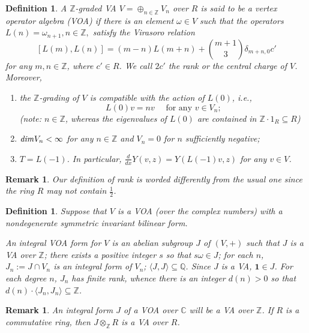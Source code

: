 \documentclass[12pt]{article}
\def\labtt#1{\label {#1} }
\def\CC{{\mathbb C}}
\def\ZZ{{\mathbb Z}}
\def\bs{\it}            %
\def\dim{{\bs dim}}
\newtheorem{rem}[thm]{Remark}
\newtheorem{de}[thm]{Definition}
\begin{document}
\begin{de}\labtt{defvoa}
A $\ZZ$-graded VA  $V=\oplus _{n\in \ZZ}  V_{n}$ over $R$ is said to be a  \emph{vertex operator algebra (VOA)}  if there is an element $\omega \in V$ such that the operators $L(n)=\omega_{n+1}, n\in \ZZ,$ satisfy the Virasoro relation
\[
[L(m) , L (n)] = (m - n) L (m + n) + \binom{m+1}3 \delta_{m+n,0} c'
\]
for  any $m, n\in \ZZ$, where $c' \in R$.   We call  $2c'$ the rank or the central charge of $V$.   Moreover,
\begin{enumerate}
\item  the $\ZZ$-grading of $V$ is compatible with the action of $L(0)$, i.e.,
\[
L (0) v = nv \quad \text{ for any }v \in V_n;
\]
(note:  $n\in \ZZ$, whereas the eigenvalues of $L(0)$ are contained in $\ZZ\cdot 1_R \subseteq   R$)


\item $\dim V_n< \infty $ for any $n\in \ZZ$ and $V_n=0$ for $n$ sufficiently negative;

\item $T=L(-1)$. In particular,  $\frac{d} {dx} Y (v, z) = Y (L ( -1) v, z)$ for any $v\in V$.
\end{enumerate}
\end{de}


\begin{rem}
 Our definition of rank is worded  differently from the usual one since the ring $R$ may not contain $\frac 12$.
\end{rem}


\begin{de}\labtt{defif} Suppose that $V$ is a VOA (over the complex numbers) with a
nondegenerate symmetric invariant bilinear form.

 An integral VOA form  for $V$ is an abelian subgroup $J$ of $(V, +)$ such that $J$ is a VA over
$\mathbb{Z}$; there exists a positive integer $s$ so that $s\omega\in J$; for each $n$, $J_n := J\cap V_n$
is an integral form of $V_n$; $\langle J, J\rangle \subseteq \mathbb{Q}$. Since $J$ is a VA, $\mathbf{1}\in J$. For each degree $n$, $J_n$ has finite rank, whence there is an integer $d(n) > 0$ so that
$d(n)\cdot \langle J_n, J_n\rangle \subseteq \mathbb{Z}$.
\end{de}



\begin{rem}
An integral form $J$ of a VOA over $\CC$ will be a VA over $\mathbb{Z}$. If $R$ is a commutative ring, then $J\otimes_\ZZ
R $ is a VA over $R$.
\end{rem}
\end{document}
